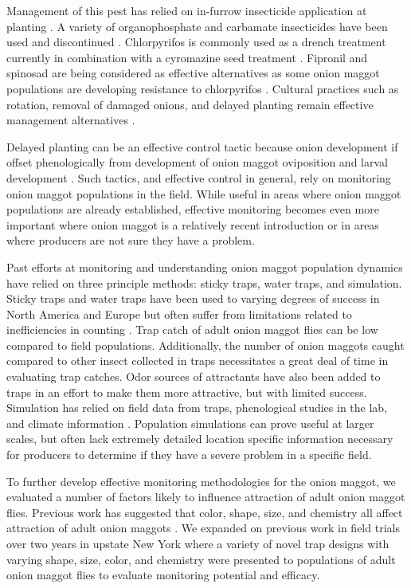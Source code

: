 \documentclass[alpha-refs]{wiley-article}
\begin{document}
Management of this pest has relied on in-furrow insecticide application at planting \citep{nault2006performance}.  A variety of organophosphate and carbamate insecticides have been used and discontinued \citep{nault2006performance}.  Chlorpyrifos is commonly used as a drench treatment currently in combination with a cyromazine seed treatment \citep{nault2006performance}.  Fipronil and spinosad are being considered as effective alternatives as some onion maggot populations are developing resistance to chlorpyrifos \citep{nault2006onion}.  Cultural practices such as rotation, removal of damaged onions, and delayed planting remain effective management alternatives \citep{martinson1988dispersal, finch1985influence, nault2011delaying}.  

Delayed planting can be an effective control tactic because onion development if offset phenologically from development of onion maggot oviposition and larval development \citep{nault2011delaying}.  Such tactics, and effective control in general, rely on monitoring onion maggot populations in the field.  While useful in areas where onion maggot populations are already established, effective monitoring becomes even more important where onion maggot is a relatively recent introduction or in areas where producers are not sure they have a problem.  

Past efforts at monitoring and understanding onion maggot population dynamics have relied on three principle methods: sticky traps, water traps, and simulation.  Sticky traps and water traps have been used to varying degrees of success in North America and Europe but often suffer from limitations related to inefficiencies in counting \citep{thomingdeveloping,otto2000development}.  Trap catch of adult onion maggot flies can be low compared to field populations.  Additionally, the number of onion maggots caught compared to other insect collected in traps necessitates a great deal of time in evaluating trap catches.  Odor sources of attractants have also been added to traps in an effort to make them more attractive, but with limited success.  Simulation has relied on field data from traps, phenological studies in the lab, and climate information \citep{thomingdeveloping,otto2000development,ning2017predicting}.  Population simulations can prove useful at larger scales, but often lack extremely detailed location specific information necessary for producers to determine if they have a severe problem in a specific field.  

To further develop effective monitoring methodologies for the onion maggot, we evaluated a number of factors likely to influence attraction of adult onion maggot flies.  Previous work has suggested that color, shape, size, and chemistry all affect attraction of adult onion maggots \citep{harris1983color,harris1988host, thomingdeveloping, otto2000development}. We expanded on previous work in field trials over two years in upstate New York where a variety of novel trap designs with varying shape, size, color, and chemistry were presented to populations of adult onion maggot flies to evaluate monitoring potential and efficacy.  
\end{document}
